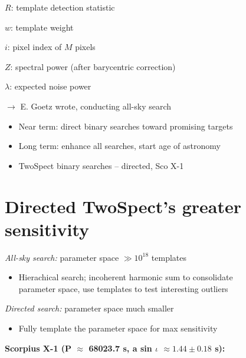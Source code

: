 $R$: template detection statistic


$w$: template weight


$i$: pixel index of $M$ pixels


$Z$: spectral power (after barycentric correction)


$\lambda$: expected noise power


$\rightarrow$ E. Goetz wrote, conducting all-sky search




\begin{itemize}
\item Near term: direct binary searches toward promising targets
\item Long term: enhance all searches, start age of astronomy
\item TwoSpect binary searches -- directed, Sco X-1
\end{itemize}



\section{Directed TwoSpect's greater sensitivity}


\emph{All-sky search: }parameter space $\gg10^{18}$ templates
\begin{itemize}
\item Hierachical search; incoherent harmonic sum to consolidate\\
parameter space, use templates to test interesting outliers
\end{itemize}

\emph{Directed search: }parameter space much smaller
\begin{itemize}
\item Fully template the parameter space for max sensitivity
\end{itemize}

\textbf{Scorpius X-1 (P $\approx$$ $ 68023.7 s, a sin $\iota$ $\approx1.44\pm0.18$
s):}


